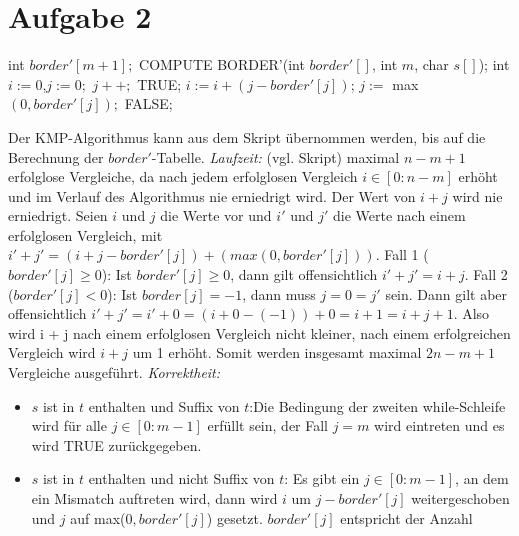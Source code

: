\documentclass[a4paper,10pt,oneside,leqno]{scrartcl}
\begin{document}
\section*{Aufgabe 2}
\begin{algorithmic}
\State int $border'[m+1];$
\State COMPUTE BORDER'(int $border'[]$, int $m$, char $s[]$);
\State int $i := 0$,$j:=0;$
    \State $j++;$
     \State \Return TRUE;\EndIf
  \EndWhile
  \State $i := i + (j-border'[j])$;
  \State $j :=$ max$(0, border'[j]);$
\EndWhile
\State \Return FALSE;
\EndFunction
\end{algorithmic}
Der KMP-Algorithmus kann aus dem Skript übernommen werden, bis auf die Berechnung der $border'$-Tabelle.\newline
\textit{Laufzeit:} (vgl. Skript) maximal $n-m+1$ erfolglose Vergleiche, da nach jedem erfolglosen Vergleich $i\in [0 : n- m]$ erhöht und
im Verlauf des Algorithmus nie erniedrigt wird. Der Wert von $i+j$ wird nie erniedrigt. Seien $i$ und $j$ die Werte vor und $i'$ und $j'$
die Werte nach einem erfolglosen Vergleich, mit $i' + j' = (i + j- border'[j]) + (max(0, border'[j]))$.\newline
Fall 1 ($border'[j] \geq 0$): Ist $border'[j] \geq 0$, dann gilt offensichtlich $i'+j' = i + j$.\newline
Fall 2 ($border'[j] < 0$): Ist $border[j] = -1$, dann muss $j = 0 = j'$ sein. Dann gilt
aber offensichtlich $i'+j' = i' + 0 = (i + 0 -(-1)) + 0 = i + 1 = i + j + 1$.\newline
Also wird i + j nach einem erfolglosen Vergleich nicht kleiner, nach einem erfolgreichen Vergleich wird $i + j$ um 1 erhöht.
Somit werden insgesamt maximal $2n- m + 1$ Vergleiche ausgeführt.\newline
\textit{Korrektheit:}
\begin{itemize}
  \item $s$ ist in $t$ enthalten und Suffix von $t$:\newline Die Bedingung der zweiten while-Schleife wird für alle $j\in [0:m-1]$ erfüllt sein,
  der Fall $j=m$ wird eintreten und es wird TRUE zurückgegeben.
  \item $s$ ist in $t$ enthalten und nicht Suffix von $t$: Es gibt ein $j\in [0:m-1]$, an dem ein Mismatch auftreten wird, dann wird $i$ um
  $j-border'[j]$ weitergeschoben und $j$ auf max($0,border'[j]$) gesetzt. $border'[j]$ entspricht der Anzahl
\end{itemize}
\end{document}
